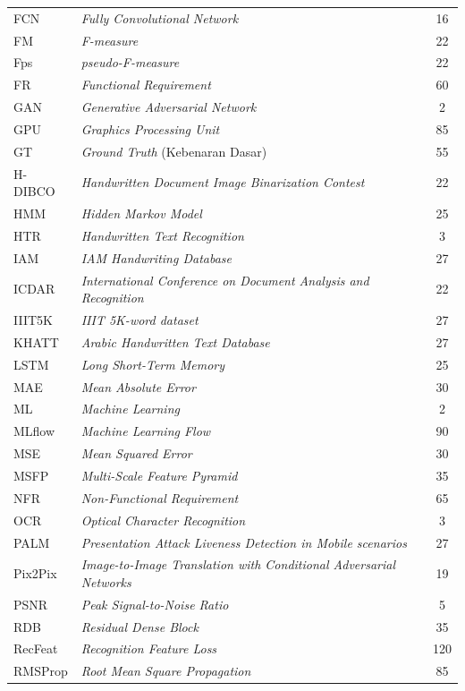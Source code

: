 \documentclass[12pt,a4paper]{article}
\begin{document}
\begin{longtable}{@{} l >{\raggedright\arraybackslash}p{7.5cm} c @{}}
FCN & \textit{Fully Convolutional Network} & 16 \\
FM & \textit{F-measure} & 22 \\
Fps & \textit{pseudo-F-measure} & 22 \\
FR & \textit{Functional Requirement} & 60 \\
GAN & \textit{Generative Adversarial Network} & 2 \\
GPU & \textit{Graphics Processing Unit} & 85 \\
GT & \textit{Ground Truth} (Kebenaran Dasar) & 55 \\
H-DIBCO & \textit{Handwritten Document Image Binarization Contest} & 22 \\
HMM & \textit{Hidden Markov Model} & 25 \\
HTR & \textit{Handwritten Text Recognition} & 3 \\
IAM & \textit{IAM Handwriting Database} & 27 \\
ICDAR & \textit{International Conference on Document Analysis and Recognition} & 22 \\
IIIT5K & \textit{IIIT 5K-word dataset} & 27 \\
KHATT & \textit{Arabic Handwritten Text Database} & 27 \\
LSTM & \textit{Long Short-Term Memory} & 25 \\
MAE & \textit{Mean Absolute Error} & 30 \\
ML & \textit{Machine Learning}  & 2 \\
MLflow & \textit{Machine Learning Flow} & 90 \\
MSE & \textit{Mean Squared Error}  & 30 \\
MSFP & \textit{Multi-Scale Feature Pyramid} & 35 \\
NFR & \textit{Non-Functional Requirement}  & 65 \\
OCR & \textit{Optical Character Recognition} & 3 \\
PALM & \textit{Presentation Attack Liveness Detection in Mobile scenarios} & 27 \\
Pix2Pix & \textit{Image-to-Image Translation with Conditional Adversarial Networks} & 19 \\
PSNR & \textit{Peak Signal-to-Noise Ratio} & 5 \\
RDB & \textit{Residual Dense Block} & 35 \\
RecFeat & \textit{Recognition Feature Loss} & 120 \\
RMSProp & \textit{Root Mean Square Propagation} & 85 \\

\end{longtable}
\end{document}
